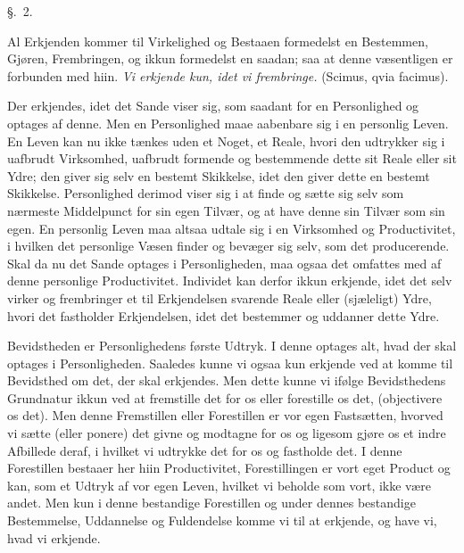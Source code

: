 \documentclass[12pt,a4paper]{book}
\newcommand{\apage}[1]{\marginnote{\footnotesize\textit{[#1]}}}
\begin{document}
\begin{center}\large\S.~2.\end{center}

Al Erkjenden kommer til Virkelighed og Bestaaen formedelst en Bestemmen, Gjøren,
Frembringen, og ikkun formedelst en saadan; saa at denne væsentligen er
forbunden med hiin. \emph{Vi erkjende kun, idet vi frembringe.} (Scimus, qvia
facimus).

Der erkjendes, idet det Sande viser sig, som saadant for en Personlighed og
optages af denne. Men en Personlighed maae aabenbare sig i en personlig Leven.
En Leven kan nu ikke tænkes uden et Noget, et Reale, hvori den udtrykker sig i
uafbrudt Virksomhed, uafbrudt formende og bestemmende dette sit Reale eller sit
Ydre; den giver sig selv en bestemt Skikkelse, idet den giver dette en bestemt
Skikkelse. Personlighed derimod viser sig i at finde og sætte sig selv som
nærmeste Middelpunct for sin egen Tilvær, og at have denne sin Tilvær som sin
egen. En personlig Leven maa altsaa udtale sig i en Virksomhed og Productivitet,
i hvilken det personlige Væsen finder og bevæger sig selv, som det producerende.
Skal da nu det \apage{19} Sande optages i Personligheden, maa ogsaa det omfattes med af
denne personlige Productivitet. Individet kan derfor ikkun erkjende, idet det
selv virker og frembringer et til Erkjendelsen svarende Reale eller (sjæleligt)
Ydre, hvori det fastholder Erkjendelsen, idet det bestemmer og uddanner dette
Ydre.

Bevidstheden er Personlighedens første Udtryk. I denne optages alt, hvad der
skal optages i Personligheden. Saaledes kunne vi ogsaa kun erkjende ved at komme
til Bevidsthed om det, der skal erkjendes. Men dette kunne vi ifølge
Bevidsthedens Grundnatur ikkun ved at fremstille det for os eller forestille os
det, (objectivere os det). Men denne Fremstillen eller Forestillen er vor egen
Fastsætten, hvorved vi sætte (eller ponere) det givne og modtagne for os og
ligesom gjøre os et indre Afbillede deraf, i hvilket vi udtrykke det for os og
fastholde det. I denne Forestillen bestaaer her hiin Productivitet,
Forestillingen er vort eget Product og kan, som et Udtryk af vor egen Leven,
hvilket vi beholde som vort, ikke være andet. Men kun i denne bestandige
Forestillen og under dennes bestandige Bestemmelse, Uddannelse og Fuldendelse
komme vi til at erkjende, og have vi, hvad vi erkjende.
\end{document}
